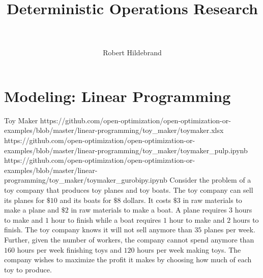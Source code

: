 \documentclass{book}
\author{Robert Hildebrand}
\affil{Virginia Tech}
\title{Deterministic Operations Research\\ 
\tblue{Sections 3.1-3.3:\\
 Modeling - Linear Programs}\\}
\renewcommand{\0}{\mathbf{0}}
\begin{document}
\maketitle
\setcounter{chapter}{2} %
\chapter{Modeling: Linear Programming}
\begin{examplewithallcode}{Toy Maker}
{https://github.com/open-optimization/open-optimization-or-examples/blob/master/linear-programming/toy_maker/toymaker.xlsx}
{https://github.com/open-optimization/open-optimization-or-examples/blob/master/linear-programming/toy_maker/toymaker_pulp.ipynb}
{https://github.com/open-optimization/open-optimization-or-examples/blob/master/linear-programming/toy_maker/toymaker_gurobipy.ipynb}
Consider the problem of a toy company that produces toy planes and toy boats. The toy company can sell its planes for $\$10$ and its boats for $\$8$ dollars. It costs $\$3$ in raw materials to make a plane and $\$2$ in raw materials to make a boat. A plane requires $3$ hours to make and $1$ hour to finish while a boat requires $1$ hour to make and $2$ hours to finish. The toy company knows it will not sell anymore than $35$ planes per week. Further, given the number of workers, the company cannot spend anymore than $160$ hours per week finishing toys and $120$ hours per week making toys. The company wishes to maximize the profit it makes by choosing how much of each toy to produce. 

\newpage 


\end{examplewithallcode}
\end{document}
